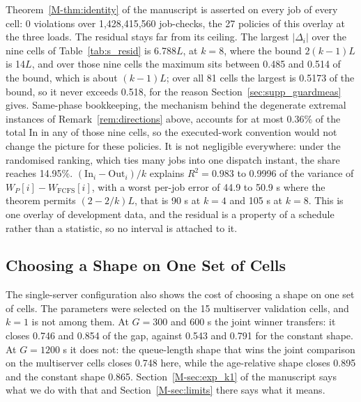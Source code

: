 \documentclass[mathematics,supfile,submit,moreauthors]{Definitions/mdpi}
\newcommand{\devnum}[1]{#1}
\begin{document}
Theorem~\ref*{M-thm:identity} of the manuscript is asserted on every job of every cell: \devnum{0} violations over
\devnum{1{,}428{,}415{,}560} job-checks, the \devnum{27} policies of this overlay at the three
loads. The residual stays far from its ceiling. The
largest $|\Delta_i|$ over the nine cells of Table~\ref{tab:s_resid} is \devnum{6.788}$L$, at
$k = \devnum{8}$, where the
bound $2(k-1)L$ is \devnum{14}$L$, and over those nine cells the maximum sits between
\devnum{0.485} and \devnum{0.514} of the bound, which is about $(k-1)L$; over all
\devnum{81} cells the largest is \devnum{0.5173} of the bound, so it never exceeds
\devnum{0.518}, for the reason Section~\ref{sec:supp_guardmeas} gives. Same-phase bookkeeping, the mechanism
behind the degenerate extremal instances of Remark~\ref{rem:directions} above, accounts for at most
\devnum{0.36\%} of the total $\mathrm{In}$ in any of those nine cells, so the executed-work
convention would not change the picture for these
policies. It is not negligible everywhere: under the randomised ranking, which ties many jobs
into one dispatch instant, the share reaches \devnum{14.95\%}.
$(\mathrm{In}_i - \mathrm{Out}_i)/k$ explains $R^2 = \devnum{0.983}$ to \devnum{0.9996} of the
variance of $W_P[i] - W_{\mathrm{FCFS}}[i]$, with a worst per-job error of \devnum{44.9} to
\devnum{50.9} s where the theorem permits $(2-2/k)L$, that is \devnum{90} s at $k = 4$ and
\devnum{105} s at $k = 8$. This is one overlay of development data, and the residual is a
property of a schedule rather than a statistic, so no interval is attached to it.



\subsection{Choosing a Shape on One Set of Cells}
\label{sec:supp_k1shape}

The single-server configuration also shows the cost of choosing a shape on one set of cells.
The parameters were selected on the \devnum{15} multiserver validation cells, and $k = 1$ is
not among them. At $G = \devnum{300}$ and $\devnum{600}$ s the joint winner transfers: it closes
\devnum{0.746} and \devnum{0.854} of the gap, against \devnum{0.543} and \devnum{0.791} for the
constant shape. At $G = \devnum{1200}$ s it does not: the queue-length shape that wins the
joint comparison on the multiserver cells closes \devnum{0.748} here, while the age-relative
shape closes \devnum{0.895} and the constant shape \devnum{0.865}. Section~\ref*{M-sec:exp_k1} of the
manuscript says what we do with that and Section~\ref*{M-sec:limits} there says what it means.
\end{document}
